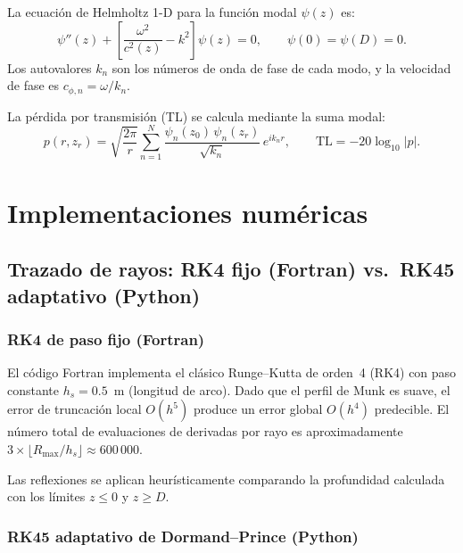 \documentclass[12pt,a4paper]{article}
\begin{document}
La ecuación de Helmholtz 1-D para la función modal $\psi(z)$ es:
\begin{equation}
  \psi''(z) + \left[\frac{\omega^2}{c^2(z)} - k^2\right]\psi(z) = 0,
  \qquad \psi(0)=\psi(D)=0.
  \label{eq:helmholtz}
\end{equation}
Los autovalores $k_n$ son los números de onda de fase de cada modo, y la
velocidad de fase es $c_{\phi,n} = \omega/k_n$.

La pérdida por transmisión (TL) se calcula mediante la suma modal:
\begin{equation}
  p(r,z_r) = \sqrt{\frac{2\pi}{r}}
              \sum_{n=1}^{N}\frac{\psi_n(z_0)\,\psi_n(z_r)}{\sqrt{k_n}}
              \,e^{i k_n r},
  \qquad
  \mathrm{TL} = -20\log_{10}|p|.
  \label{eq:tl}
\end{equation}

\section{Implementaciones numéricas}

\subsection{Trazado de rayos: RK4 fijo (Fortran) vs.\ RK45 adaptativo (Python)}

\subsubsection{RK4 de paso fijo (Fortran)}

El código Fortran implementa el clásico Runge--Kutta de orden~4 (RK4) con
paso constante $h_s = 0.5$~m (longitud de arco). Dado que el perfil de Munk
es suave, el error de truncación local $O(h^5)$ produce un error global $O(h^4)$
predecible. El número total de evaluaciones de derivadas por rayo es
aproximadamente $3 \times \lfloor R_{\max}/h_s \rfloor \approx 600\,000$.

Las reflexiones se aplican heurísticamente comparando la profundidad calculada
con los límites $z \le 0$ y $z \ge D$.

\subsubsection{RK45 adaptativo de Dormand--Prince (Python)}
\end{document}
